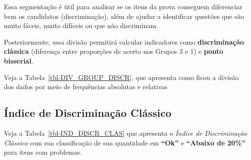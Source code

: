 \documentclass[
  portuguese,
  11pt,
  a4paper,
  DIV=11,
  numbers=noendperiod]{scrreprt}
\begin{document}
Essa segmentação é útil para analisar se os itens da prova conseguem
diferenciar bem os candidatos (discriminação), além de ajudar a
identificar questões que são muito fáceis, muito difíceis ou que não
discriminam.

Posteriormente, essa divisão permitirá calcular indicadores como
\textbf{discriminação clássica} (diferença entre proporções de acerto
nos Grupos 3 e 1) e \textbf{ponto bisserial}.

Veja a Tabela~\ref{tbl-DIV_GROUP_DISCR}, que apresenta como ficou a
divisão dos dados por meio de frequências absolutas e relativas

\begin{table}

\caption{\label{tbl-DIV_GROUP_DISCR}Frequência dos Grupos de Desempenho
da Prova do ENADE para o Curso de Sitemas de Informação.}


\end{table}%

\subsection{Índice de Discriminação
Clássico}\label{uxedndice-de-discriminauxe7uxe3o-cluxe1ssico}

Veja a Tabela~\ref{tbl-IND_DISCR_CLAS} que apresenta o \emph{Índice de
Discriminação Clássico} com sua classificação de sua quantidade em
\textbf{``Ok''} e \textbf{``Abaixo de 20\%''} para itens com problemas.
\end{document}
